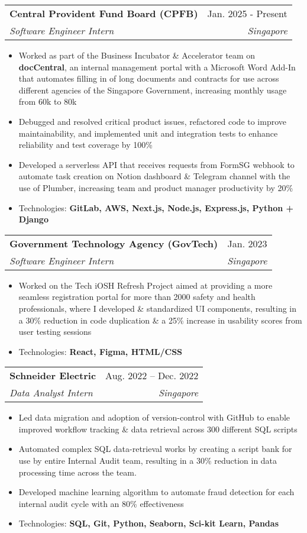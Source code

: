 \documentclass[letterpaper,11pt]{article}
\makeatletter
\newcommand{\resumeItem}[1]{
  \item\small{
    {#1 \vspace{-2pt}}
  }
}
\newcommand{\resumeSubheading}[4]{
  \vspace{-2pt}\item
    \begin{tabular*}{0.97\textwidth}[t]{l@{\extracolsep{\fill}}r}
      \textbf{#1} & #2 \\
      \textit{\small#3} & \textit{\small #4} \\
    \end{tabular*}\vspace{-7pt}
}
\newcommand{\resumeSubSubheading}[2]{
    \item
    \begin{tabular*}{0.97\textwidth}{l@{\extracolsep{\fill}}r}
      \textit{\small#1} & \textit{\small #2} \\
    \end{tabular*}\vspace{-7pt}
}
\newcommand{\resumeSubHeadingListEnd}{\end{itemize}}
\newcommand{\resumeItemListStart}{\begin{itemize}}
\newcommand{\resumeItemListEnd}{\end{itemize}\vspace{-5pt}}
\makeatother
\begin{document}
    \resumeSubheading
      {Central Provident Fund Board (CPFB)}{Jan. 2025 - Present}
      {Software Engineer Intern}{Singapore}
      \resumeItemListStart
        \resumeItem{Worked as part of the Business Incubator \& Accelerator team on \textbf{docCentral}, an internal management portal with a Microsoft Word Add-In that automates filling in of long documents and contracts for use across different agencies of the Singapore Government, increasing monthly usage from 60k to 80k}
        \resumeItem{Debugged and resolved critical product issues, refactored code to improve maintainability, and implemented unit and integration tests to enhance reliability and test coverage by 100\%}
        \resumeItem{Developed a serverless API that receives requests from FormSG webhook to automate task creation on Notion dashboard \& Telegram channel with the use of Plumber, increasing team and product manager productivity by 20\%}
        \resumeItem{Technologies: \textbf{GitLab, AWS, Next.js, Node.js, Express.js, Python + Django}}
    \resumeItemListEnd

    \resumeSubheading
      {Government Technology Agency (GovTech)}{Jan. 2023}
      {Software Engineer Intern}{Singapore}
      \resumeItemListStart
        \resumeItem{Worked on the Tech iOSH Refresh Project aimed at providing a more seamless registration portal for more than 2000 safety and health professionals, where I developed \& standardized UI components, resulting in a 30\% reduction in code duplication \& a 25\% increase in usability scores from user testing sessions}
        \resumeItem{Technologies: \textbf{React, Figma, HTML/CSS}}
      \resumeItemListEnd

    \resumeSubheading
      {Schneider Electric}{Aug. 2022 -- Dec. 2022}
      {Data Analyst Intern}{Singapore}
      \resumeItemListStart
        \resumeItem{Led data migration and adoption of version-control with GitHub to enable improved workflow tracking \& data retrieval across 300 different SQL scripts}
        \resumeItem{Automated complex SQL data-retrieval works by creating a script bank for use by entire Internal Audit team, resulting in a 30\% reduction in data processing time across the team.}
        \resumeItem{Developed machine learning algorithm to automate fraud detection for each internal audit cycle with an 80\% effectiveness}
        \resumeItem{Technologies: \textbf{SQL, Git, Python, Seaborn, Sci-kit Learn, Pandas}}
      \resumeItemListEnd
\end{document}
